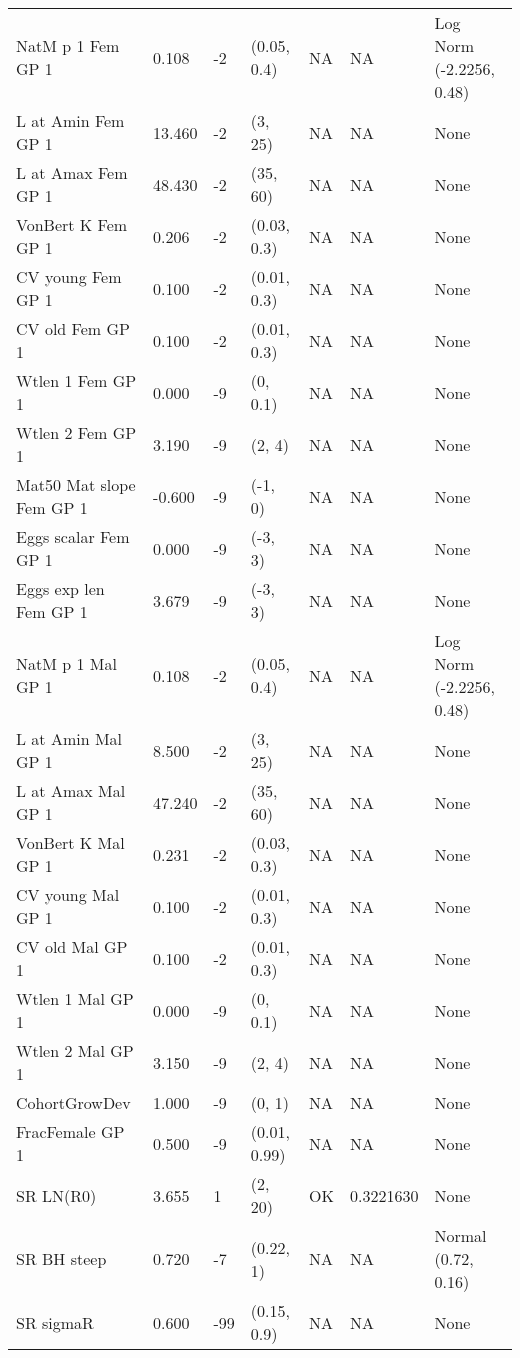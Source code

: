 \documentclass[11pt,
  english,
  a4paper,
]{article}
\begin{document}
\begin{landscape}
\begin{longtable}[t]{>{\raggedright\arraybackslash}p{6cm}lllll>{\raggedright\arraybackslash}p{4cm}}
\endfoot
\bottomrule
\endlastfoot
NatM p 1 Fem GP 1 & 0.108 & -2 & (0.05, 0.4) & NA & NA & Log Norm (-2.2256, 0.48)\\
L at Amin Fem GP 1 & 13.460 & -2 & (3, 25) & NA & NA & None\\
L at Amax Fem GP 1 & 48.430 & -2 & (35, 60) & NA & NA & None\\
VonBert K Fem GP 1 & 0.206 & -2 & (0.03, 0.3) & NA & NA & None\\
CV young Fem GP 1 & 0.100 & -2 & (0.01, 0.3) & NA & NA & None\\
CV old Fem GP 1 & 0.100 & -2 & (0.01, 0.3) & NA & NA & None\\
Wtlen 1 Fem GP 1 & 0.000 & -9 & (0, 0.1) & NA & NA & None\\
Wtlen 2 Fem GP 1 & 3.190 & -9 & (2, 4) & NA & NA & None\\
Mat50%
Mat slope Fem GP 1 & -0.600 & -9 & (-1, 0) & NA & NA & None\\
Eggs scalar Fem GP 1 & 0.000 & -9 & (-3, 3) & NA & NA & None\\
Eggs exp len Fem GP 1 & 3.679 & -9 & (-3, 3) & NA & NA & None\\
NatM p 1 Mal GP 1 & 0.108 & -2 & (0.05, 0.4) & NA & NA & Log Norm (-2.2256, 0.48)\\
L at Amin Mal GP 1 & 8.500 & -2 & (3, 25) & NA & NA & None\\
L at Amax Mal GP 1 & 47.240 & -2 & (35, 60) & NA & NA & None\\
VonBert K Mal GP 1 & 0.231 & -2 & (0.03, 0.3) & NA & NA & None\\
CV young Mal GP 1 & 0.100 & -2 & (0.01, 0.3) & NA & NA & None\\
CV old Mal GP 1 & 0.100 & -2 & (0.01, 0.3) & NA & NA & None\\
Wtlen 1 Mal GP 1 & 0.000 & -9 & (0, 0.1) & NA & NA & None\\
Wtlen 2 Mal GP 1 & 3.150 & -9 & (2, 4) & NA & NA & None\\
CohortGrowDev & 1.000 & -9 & (0, 1) & NA & NA & None\\
FracFemale GP 1 & 0.500 & -9 & (0.01, 0.99) & NA & NA & None\\
SR LN(R0) & 3.655 & 1 & (2, 20) & OK & 0.3221630 & None\\
SR BH steep & 0.720 & -7 & (0.22, 1) & NA & NA & Normal (0.72, 0.16)\\
SR sigmaR & 0.600 & -99 & (0.15, 0.9) & NA & NA & None\\

\end{longtable}
\end{landscape}
\end{document}
